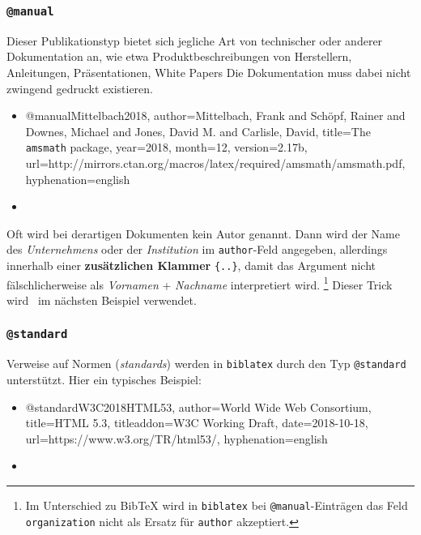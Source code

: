 
\subsubsection{\texttt{@manual}}
\label{sec:@manual}
Dieser Publikationstyp bietet sich jegliche Art von technischer oder anderer Dokumentation an, wie etwa Produktbeschreibungen von Herstellern, Anleitungen, Präsentationen, White Papers \usw Die Dokumentation muss dabei nicht zwingend gedruckt existieren.
%
\begin{itemize}
\item[]
\begin{GenericCode}[numbers=none]
@manual{Mittelbach2018,
  author={Mittelbach, Frank and Schöpf, Rainer and Downes, Michael and Jones, David M. and Carlisle, David},
  title={The \texttt{amsmath} package},
  year={2018},
  month={12},
  version={2.17b},
  url={http://mirrors.ctan.org/macros/latex/required/amsmath/amsmath.pdf},
  hyphenation={english}
}
\end{GenericCode}
\item[\cite{Mittelbach2018}] 
\end{itemize}
%
Oft wird bei derartigen Dokumenten kein Autor genannt. Dann wird der Name des \emph{Unternehmens} oder der \emph{Institution} im \texttt{author}-Feld angegeben, allerdings innerhalb einer \textbf{zusätzlichen Klammer} \texttt{\{..\}}, damit das Argument nicht fälschlicherweise als \emph{Vornamen} + \emph{Nachname} interpretiert wird.%
\footnote{Im Unterschied zu BibTeX wird in \texttt{biblatex} bei \texttt{@manual}-Einträgen das Feld \texttt{organization} nicht als Ersatz für \texttt{author} akzeptiert.}
Dieser Trick wird \ua\ im nächsten Beispiel verwendet.



\subsubsection{\texttt{@standard}}
\label{sec:@standard}


Verweise auf Normen (\emph{standards}) werden in \texttt{biblatex} durch den Typ \texttt{@standard}
unterstützt. Hier ein typisches Beispiel:
%
\begin{itemize}
\item[]
\begin{GenericCode}[numbers=none]
@standard{W3C2018HTML53,
	author={{World Wide Web Consortium}},
	title={HTML 5.3},
	titleaddon={W3C Working Draft},
	date={2018-10-18},
	url={https://www.w3.org/TR/html53/},
	hyphenation={english}
}
\end{GenericCode}
\item[\cite{W3C2018HTML53}] 
\end{itemize}
%

